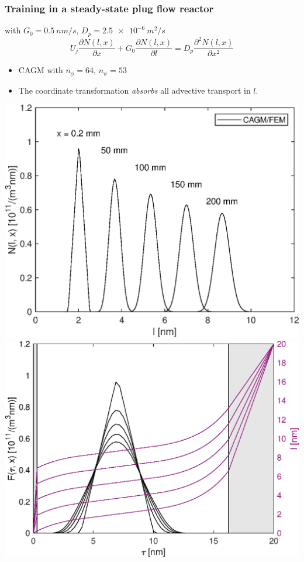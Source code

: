 \documentclass[10pt,xcolor=dvipsnames]{beamer}
\newcommand*{\itemskip}{0.25\baselineskip}
\begin{document}

\begin{frame}[t]

  \frametitle{Training in a steady-state plug flow reactor}

   with $G_0 = \SI{0.5}{nm/s}$, $D_p = \SI{2.5e-6}{m^2/s}$
  \begin{equation*}
    U_j \frac{\partial N(l, x)}{\partial x} + G_0 \frac{\partial N(l, x)}{\partial l}
    = D_p \frac{\partial^2 N(l, x)}{\partial x^2}
  \label{eq:plugflow}
  \end{equation*}

  \begin{itemize}
  \vspace{\itemskip}
  \item CAGM with $n_{\phi} = 64$, $n_{\psi} = 53$
  \vspace{\itemskip}
  \item The coordinate transformation \textit{absorbs} all advective transport in $l$.
  \vspace{\itemskip}
  \end{itemize}
  \includegraphics[height=0.38\columnwidth,clip]{fig/plugflow_N.eps}\hfill
  \includegraphics[height=0.38\columnwidth,clip]{fig/plugflow_Fl.eps}\\

\end{frame}
\end{document}
